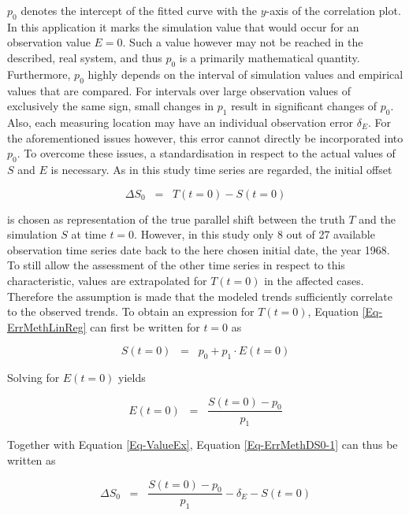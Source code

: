$p_0$ denotes the intercept of the fitted curve with the $y$-axis of the correlation plot. 
In this application it marks the simulation value that would occur for an observation value $E = 0$. 
Such a value however may not be reached in the described, real system, and thus $p_0$ is a primarily mathematical quantity. 
Furthermore, $p_0$ highly depends on the interval of simulation values and empirical values that are compared. 
For intervals over large observation values of exclusively the same sign, small changes in $p_1$ result in significant changes of $p_0$. 
Also, each measuring location may have an individual observation error $\delta_E$. 
For the aforementioned issues however, this error cannot directly be incorporated into $p_0$. 
To overcome these issues, a standardisation in respect to the actual values of $S$ and $E$ is necessary. 
As in this study time series are regarded, the initial offset

\begin{equation}
    \label{Eq-ErrMethDS0-1}
    \Delta S_0 \; \; = \; \; T(t\!=\!0) - S(t\!=\!0)
\end{equation}

\noindent is chosen as representation of the true parallel shift between the truth $T$ and the simulation $S$ at time $t\!=\!0$. 
However, in this study only 8 out of 27 available observation time series date back to the here chosen initial date, the year 1968. 
To still allow the assessment of the other time series in respect to this characteristic, values are extrapolated for $T(t\!=\!0)$ in the affected cases. 
Therefore the assumption is made that the modeled trends sufficiently correlate to the observed trends. 
To obtain an expression for $T(t\!=\!0)$, Equation \eqref{Eq-ErrMethLinReg} can first be written for $t\!=\!0$ as

\begin{equation}
    \label{Eq-ErrMethDS0-2}
    S(t\!=\!0) \; \; = \; \; p_0 + p_1 \cdot E(t\!=\!0)
\end{equation}

\noindent Solving for $E(t\!=\!0)$ yields

\begin{equation}
    \label{Eq-ErrMethDS0-3}
    E(t\!=\!0) \; \; = \; \; \frac{S(t\!=\!0) - p_0}{p_1}
\end{equation}

Together with Equation \eqref{Eq-ValueEx}, Equation \eqref{Eq-ErrMethDS0-1} can thus be written as

\begin{equation}
    \label{Eq-ErrMethDS0-4}
    \Delta S_0 \; \; = \; \; \frac{S(t=0) - p_0}{p_1} - \delta_E - S(t\!=\!0)
\end{equation}


